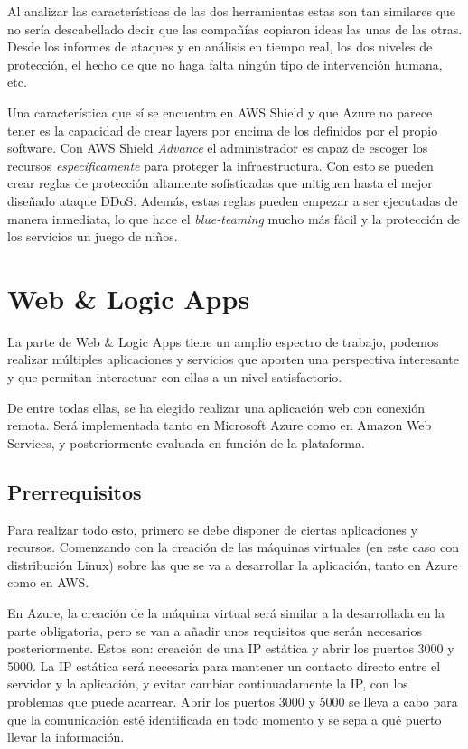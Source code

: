 \documentclass[english,runningheads,a4paper]{llncs}[2018/03/10]
\begin{document}
Al analizar las características de las dos herramientas estas son tan similares
que no sería descabellado decir que las compañías copiaron ideas las unas de las
otras. Desde los informes de ataques y en análisis en tiempo real, los dos
niveles de protección, el hecho de que no haga falta ningún tipo de intervención
humana, etc.

Una característica que sí se encuentra en AWS Shield y que Azure no parece tener
es la capacidad de crear layers por encima de los definidos por el propio
software. Con AWS Shield \textit{Advance} el administrador es capaz de escoger
los recursos \textit{específicamente} para proteger la infraestructura. Con esto
se pueden crear reglas de protección altamente sofisticadas que mitiguen hasta
el mejor diseñado ataque DDoS. Además, estas reglas pueden empezar a ser
ejecutadas de manera inmediata, lo que hace el \textit{blue-teaming} mucho más
fácil y la protección de los servicios un juego de niños.

\section{Web \& Logic Apps}

La parte de Web \& Logic Apps tiene un amplio espectro de trabajo, podemos realizar
múltiples aplicaciones y servicios que aporten una perspectiva interesante y que
permitan interactuar con ellas a un nivel satisfactorio.

De entre todas ellas, se ha elegido realizar una aplicación web con conexión remota.
Será implementada tanto en Microsoft Azure como en Amazon Web Services, y
posteriormente evaluada en función de la plataforma.

\subsection{Prerrequisitos}

Para realizar todo esto, primero se debe disponer de ciertas aplicaciones y
recursos. Comenzando con la creación de las máquinas virtuales (en este caso con
distribución Linux) sobre las que se va a desarrollar la aplicación, tanto en Azure
como en AWS.

En Azure, la creación de la máquina virtual será similar a la desarrollada en la
parte obligatoria, pero se van a añadir unos requisitos que serán necesarios
posteriormente. Estos son: creación de una IP estática y abrir los puertos 3000 y
5000. La IP estática será necesaria para mantener un contacto directo entre el
servidor y la aplicación, y evitar cambiar continuadamente la IP, con los problemas
que puede acarrear. Abrir los puertos 3000 y 5000 se lleva a cabo para que la
comunicación esté identificada en todo momento y se sepa a qué puerto llevar la
información.
\end{document}
